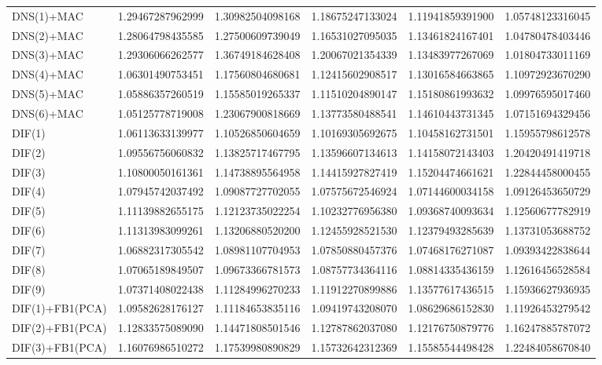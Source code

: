 \begin{table}[h]
\begin{adjustbox}{totalheight=\baselineskip}
\begin{tabular}{lSSSSS}
DNS(1)+MAC & 1.29467287962999 & 1.30982504098168 & 1.18675247133024 & 1.11941859391900 & 1.05748123316045 \\ 
DNS(2)+MAC & 1.28064798435585 & 1.27500609739049 & 1.16531027095035 & 1.13461824167401 & 1.04780478403446 \\ 
DNS(3)+MAC & 1.29306066262577 & 1.36749184628408 & 1.20067021354339 & 1.13483977267069 & 1.01804733011169 \\ 
DNS(4)+MAC & 1.06301490753451 & 1.17560804680681 & 1.12415602908517 & 1.13016584663865 & 1.10972923670290 \\ 
DNS(5)+MAC & 1.05886357260519 & 1.15585019265337 & 1.11510204890147 & 1.15180861993632 & 1.09976595017460 \\ 
DNS(6)+MAC & 1.05125778719008 & 1.23067900818669 & 1.13773580488541 & 1.14610443731345 & 1.07151694329456 \\ 
DIF(1) & 1.06113633139977 & 1.10526850604659 & 1.10169305692675 & 1.10458162731501 & 1.15955798612578 \\ 
DIF(2) & 1.09556756060832 & 1.13825717467795 & 1.13596607134613 & 1.14158072143403 & 1.20420491419718 \\ 
DIF(3) & 1.10800050161361 & 1.14738895564958 & 1.14415927827419 & 1.15204474661621 & 1.22844458000455 \\ 
DIF(4) & 1.07945742037492 & 1.09087727702055 & 1.07575672546924 & 1.07144600034158 & 1.09126453650729 \\ 
DIF(5) & 1.11139882655175 & 1.12123735022254 & 1.10232776956380 & 1.09368740093634 & 1.12560677782919 \\ 
DIF(6) & 1.11313983099261 & 1.13206880520200 & 1.12455928521530 & 1.12379493285639 & 1.13731053688752 \\ 
DIF(7) & 1.06882317305542 & 1.08981107704953 & 1.07850880457376 & 1.07468176271087 & 1.09393422838644 \\ 
DIF(8) & 1.07065189849507 & 1.09673366781573 & 1.08757734364116 & 1.08814335436159 & 1.12616456528584 \\ 
DIF(9) & 1.07371408022438 & 1.11284996270233 & 1.11912270899886 & 1.13577617436515 & 1.15936627936935 \\ 
DIF(1)+FB1(PCA) & 1.09582628176127 & 1.11184653835116 & 1.09419743208070 & 1.08629686152830 & 1.11926453279542 \\ 
DIF(2)+FB1(PCA) & 1.12833575089090 & 1.14471808501546 & 1.12787862037080 & 1.12176750879776 & 1.16247885787072 \\ 
DIF(3)+FB1(PCA) & 1.16076986510272 & 1.17539980890829 & 1.15732642312369 & 1.15585544498428 & 1.22484058670840 \\ 

\end{tabular}
\end{adjustbox}
\end{table}
